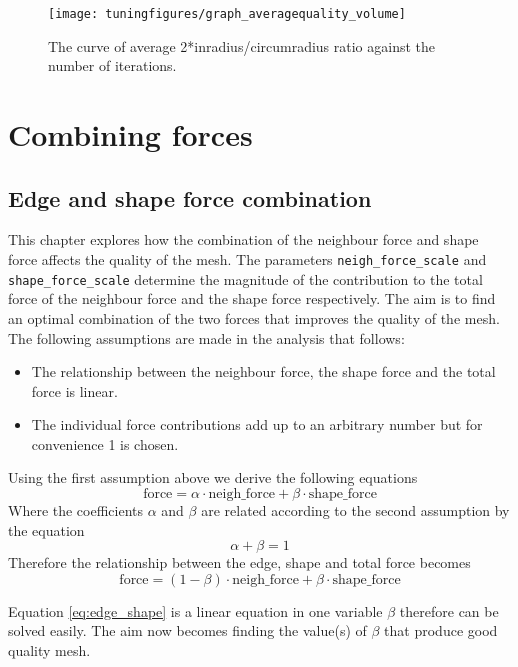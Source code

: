 \documentclass[10pt,a4paper]{book}
\begin{document}
\begin{figure}[tbhp]
\centerline{\texttt{[image: tuningfigures/graph\_averagequality\_volume]}}
\caption{\label{fig:graph_averagequality_volume} The curve of average 2*inradius/circumradius ratio against the number of iterations.}
\end{figure}





\chapter{Combining forces}
\label{chap:combiningforces}
\section{Edge and shape force combination}
\label{sec:edgeandshapeforcecombination}
This chapter explores how the combination of the neighbour force and shape force affects the quality of the mesh. The parameters \texttt{neigh\_force\_scale} and \texttt{shape\_force\_scale} determine the magnitude of the contribution to the total force of the neighbour force and the shape force respectively. The aim is to find an optimal combination of the two forces that improves the quality of the mesh.
The following assumptions are made in the analysis that follows:
\begin{itemize}
\item The relationship between the neighbour force, the shape force and the total force is linear.
\item The individual force contributions add up to an arbitrary number but for convenience 1 is chosen.
\end{itemize}

Using the first assumption above we derive the following equations
\[
\textrm{force} = \alpha \cdot \textrm{neigh\_force} + \beta \cdot \textrm{shape\_force}
\]
Where the coefficients $\alpha$ and $\beta$ are related according to the second assumption by the equation
\[
\alpha + \beta = 1
\]
Therefore the relationship between the edge, shape and total force becomes
\begin{equation}
\textrm{force} = (1-\beta) \cdot \textrm{neigh\_force} + \beta \cdot \textrm{shape\_force}
\label{eq:edge_shape}
\end{equation}

Equation \ref{eq:edge_shape} is  a linear equation in one variable $\beta$ therefore can be solved easily. The aim now becomes finding the value(s) of $\beta$ that produce good quality mesh.
\end{document}
